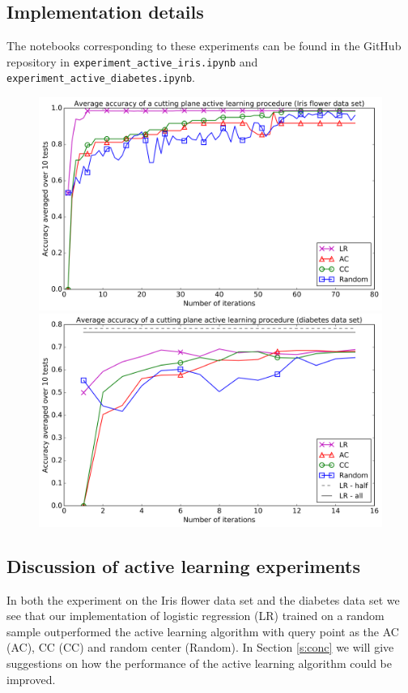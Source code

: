 \documentclass[11pt]{amsart}
\theoremstyle{definition}
\theoremstyle{remark}
\begin{document}
        \subsection{Implementation details} The notebooks corresponding to these experiments can be found in the GitHub repository in \texttt{experiment\_active\_iris.ipynb} and \texttt{experiment\_active\_diabetes.ipynb}. 

        \newpage
        \begin{figure}[h]
            \includegraphics[width=\linewidth]{figures/iris_experiment.png}
            \includegraphics[width=\linewidth]{figures/diabetes_experiment.png}
        \end{figure}
        \newpage

    \subsection{Discussion of active learning experiments}
        In both the experiment on the Iris flower data set and the diabetes data set we see that our implementation of logistic regression (LR) trained on a random sample outperformed the active learning algorithm with query point as the AC (AC), CC (CC) and random center (Random). In Section \ref{s:conc} we will give suggestions on how the performance of the active learning algorithm could be improved.
\end{document}
